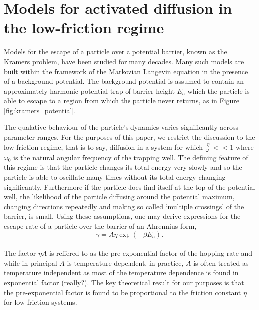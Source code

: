 \documentclass{article}
\begin{document}
\section{Models for activated diffusion in the low-friction regime}

Models for the escape of a particle over a potential barrier, known as the Kramers problem, have been studied for many decades. Many such models are built within the framework of the Markovian Langevin equation in the presence of a background potential. The background potential is assumed to contain an approximately harmonic potential trap of barrier height $E_a$ which the particle is able to escape to a region from which the particle never returns, as in Figure \ref{fig:kramers_potential}. 

The qualative behaviour of the particle's dynamics varies significantly across parameter ranges. For the purposes of this paper, we restrict the discussion to the low friction regime, that is to say, diffusion in a system for which $\frac{\eta}{\omega_0} << 1$ where $\omega_0$ is the natural angular frequency of the trapping well. The defining feature of this regime is that the particle changes its total energy very slowly and so the particle is able to oscillate many times without its total energy changing significantly. Furthermore if the particle does find itself at the top of the potential well, the likelihood of the particle diffusing around the potential maximum, changing directions repeatedly and making so called `multiple crossings' of the barrier, is small. Using these assumptions, one may derive expressions for the escape rate of a particle over the barrier of an Ahrennius form, 
\\
$$\gamma = A \eta \exp\left(-\beta E_a \right).$$ 
\\
The factor $\eta A$ is reffered to as the pre-exponential factor of the hopping rate and while in principal $A$ is temperature dependent, in practice, $A$ is often treated as temperature independent as most of the temperature dependence is found in exponential factor (really?). The key theoretical result for our purposes is that the pre-exponential factor is found to be proportional to the friction constant $\eta$ for low-friction systems.
\end{document}
